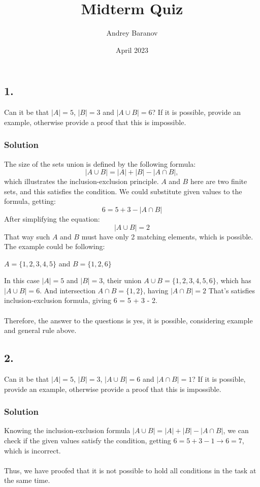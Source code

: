 \documentclass[a4paper]{article}
\title{\vspace{-2cm}Midterm Quiz}
\author{Andrey Baranov}
\date{April 2023}
\begin{document}
\maketitle
\subsection*{1.}
Can it be that \(|A| = 5\), \(|B| = 3\) and \(|A \cup B| = 6\)? If it is possible, provide an example, otherwise provide a proof that this is impossible.
\subsubsection*{Solution}
The size of the sets union is defined by the following formula: 
\[|A \cup B| = |A| + |B| - |A \cap B|,\]
which illustrates the inclusion-exclusion principle. \(A\) and \(B\) here are two finite sets, and this satisfies the condition. We could substitute given values to the formula, getting:
\[6 = 5 + 3 - |A \cap B|\]
After simplifying the equation:
\[|A \cup B| = 2\]
That way such \(A\) and \(B\) must have only 2 matching elements, which is possible. 
The example could be following:
\begin{center}
\(A = \{1, 2, 3, 4, 5\}\) and \(B = \{1, 2, 6\}\)
\end{center}
In this case \(|A| = 5\) and \(|B| = 3\), their union \(A \cup B = \{1, 2, 3, 4, 5, 6\}\), which has \(|A \cup B| = 6\). And intersection \(A \cap B = \{1, 2\}\), having \(|A \cap B| = 2\) That's satisfies inclusion-exclusion formula, giving 6 = 5 + 3 - 2. \\\\
Therefore, the answer to the questions is yes, it is possible, considering example and general rule above.

\subsection*{2.}
Can it be that \(|A| = 5\), \(|B| = 3\), \(|A \cup B| = 6\) and \(|A \cap B| = 1\)? If it is possible, provide an example, otherwise provide a proof that this is impossible.
\subsubsection*{Solution}
Knowing the inclusion-exclusion formula \(|A \cup B| = |A| + |B| - |A \cap B|\), we can check if the given values satisfy the condition, getting \(6 = 5 + 3 - 1 \rightarrow{} 6 = 7\), which is incorrect. \\\\ 
Thus, we have proofed that it is not possible to hold all conditions in the task at the same time.
\end{document}
